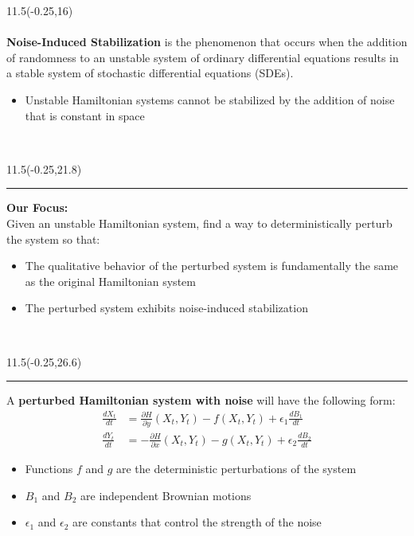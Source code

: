 \documentclass[a0]{a0poster}
\def\LHead#1{\colorbox{deepjunglegreen}{\noindent{\textbf{\Huge\color{white} #1}}\bigskip}}
\begin{document}
\begin{textblock}{11.5}(-0.25,16)
\medskip
\LHead{\parbox{11.5in}{\begin{center}Our Problem\end{center}}}\\  %
\large
\qquad\\
\textbf{Noise-Induced Stabilization} is the phenomenon that occurs when the addition of randomness to an unstable system of ordinary differential equations results in a stable system of stochastic differential equations (SDEs).

\begin{itemize}
\item Unstable Hamiltonian systems cannot be stabilized by the addition of noise that is constant in space
\end{itemize}
\qquad\\

\begin{textblock}{11.5}(-0.25,21.8)
\hspace{0in}
\hrule
\end{textblock}

\textbf{Our Focus:}\\
Given an unstable Hamiltonian system, find a way to deterministically perturb the system so that:
\begin{itemize}
\item The qualitative behavior of the perturbed system is fundamentally the same as the original Hamiltonian system
\item The perturbed system exhibits noise-induced stabilization
\end{itemize}
\qquad\\

\begin{textblock}{11.5}(-0.25,26.6)
\hspace{0in}
\hrule
\end{textblock}

A \textbf{perturbed Hamiltonian system with noise} will have the following form:
\begin{align*}
\frac{dX_t}{dt} &= \frac{\partial H}{\partial y}(X_t,Y_t) - f(X_t,Y_t) + \epsilon_1 \frac{dB_1}{dt}\\
\frac{dY_t}{dt} &= -\frac{\partial H}{\partial x}(X_t,Y_t) - g(X_t,Y_t) + \epsilon_2 \frac{dB_2}{dt}
\end{align*}

\begin{itemize}
\item Functions $f$ and $g$ are the deterministic perturbations of the system
\item $B_1$ and $B_2$ are independent Brownian motions
\item $\epsilon_1$ and $\epsilon_2$ are constants that control the strength of the noise
\end{itemize}

\end{textblock}
\end{document}
